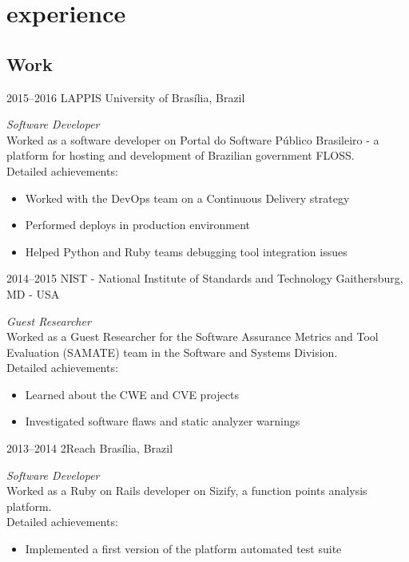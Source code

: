 \documentclass[]{friggeri-cv} %
\begin{document}

\section{experience}

\subsection{Work}

\begin{entrylist}


\entry
{2015--2016}
{LAPPIS}
{University of Brasília, Brazil}
{\emph{Software Developer} \\
  Worked as a software developer on Portal do Software Público
  Brasileiro - a platform for hosting and development of Brazilian government
  FLOSS. \\
Detailed achievements:
\begin{itemize}
  \item Worked with the DevOps team on a Continuous Delivery strategy
  \item Performed deploys in production environment
  \item Helped Python and Ruby teams debugging tool integration issues
\end{itemize}
  }


\entry
{2014--2015}
{NIST - National Institute of Standards and Technology}
{Gaithersburg, MD - USA}
{\emph{Guest Researcher} \\
  Worked as a Guest Researcher for the Software Assurance Metrics and Tool
  Evaluation (SAMATE) team in the Software and Systems Division. \\ Detailed
  achievements:
\begin{itemize}
\item Learned about the CWE and CVE projects
\item Investigated software flaws and static analyzer warnings
\end{itemize}
  }


\entry
{2013--2014}
{2Reach}
{Brasília, Brazil}
{\emph{Software Developer} \\
  Worked as a Ruby on Rails developer on Sizify, a function points analysis
  platform. \\
Detailed achievements:
\begin{itemize}
  \item Implemented a first version of the platform automated test suite
\end{itemize}}


\end{entrylist}
\end{document}
